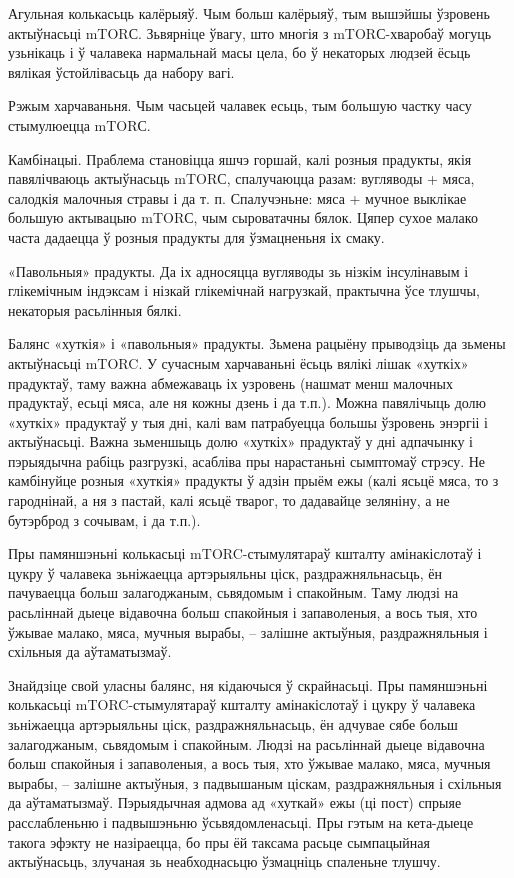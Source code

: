 Агульная колькасьць калёрыяў.
Чым больш калёрыяў, тым вышэйшы ўзровень актыўнасьці mTORС. Зьвярніце ўвагу, што многія з mTORС-хваробаў могуць узьнікаць і ў чалавека нармальнай масы цела, бо ў некаторых людзей ёсьць вялікая ўстойлівасьць да набору вагі.

Рэжым харчаваньня.
Чым часьцей чалавек есьць, тым большую частку часу стымулюецца mTORС.

Камбінацыі.
Праблема становіцца яшчэ горшай, калі розныя прадукты, якія павялічваюць актыўнасьць mTORС, спалучаюцца разам: вугляводы + мяса, салодкія малочныя стравы і да т. п. Спалучэньне: мяса + мучное выклікае большую актывацыю mTORС, чым сыроватачны бялок. Цяпер сухое малако часта дадаецца ў розныя прадукты для ўзмацненьня іх смаку.

«Павольныя» прадукты.
Да іх адносяцца вугляводы зь нізкім інсулінавым і глікемічным індэксам і нізкай глікемічнай нагрузкай, практычна ўсе тлушчы, некаторыя расьлінныя бялкі.

Балянс «хуткія» і «павольныя» прадукты.
Зьмена рацыёну прыводзіць да зьмены актыўнасьці mTORC. У сучасным харчаваньні ёсьць вялікі лішак «хуткіх» прадуктаў, таму важна абмежаваць іх узровень (нашмат менш малочных прадуктаў, есьці мяса, але ня кожны дзень і да т.п.). Можна павялічыць долю «хуткіх» прадуктаў у тыя дні, калі вам патрабуецца большы ўзровень энэргіі і актыўнасьці. Важна зьменшыць долю «хуткіх» прадуктаў у дні адпачынку і пэрыядычна рабіць разгрузкі, асабліва пры нарастаньні сымптомаў стрэсу. Не камбінуйце розныя «хуткія» прадукты ў адзін прыём ежы (калі ясьцё мяса, то з гароднінай, а ня з пастай, калі ясьцё тварог, то дадавайце зеляніну, а не бутэрброд з сочывам, і да т.п.).

Пры памяншэньні колькасьці mTORC-стымулятараў кшталту амінакіслотаў і цукру ў чалавека зьніжаецца артэрыяльны ціск, раздражняльнасьць, ён пачуваецца больш залагоджаным, сьвядомым і спакойным. Таму людзі на расьліннай дыеце відавочна больш спакойныя і запаволеныя, а вось тыя, хто ўжывае малако, мяса, мучныя вырабы, – залішне актыўныя, раздражняльныя і схільныя да аўтаматызмаў.

Знайдзіце свой уласны балянс, ня кідаючыся ў скрайнасьці.
Пры памяншэньні колькасьці mTORC-стымулятараў кшталту амінакіслотаў і цукру ў чалавека зьніжаецца артэрыяльны ціск, раздражняльнасьць, ён адчувае сябе больш залагоджаным, сьвядомым і спакойным. Людзі на расьліннай дыеце відавочна больш спакойныя і запаволеныя, а вось тыя, хто ўжывае малако, мяса, мучныя вырабы, – залішне актыўныя, з падвышаным ціскам, раздражняльныя і схільныя да аўтаматызмаў. Пэрыядычная адмова ад «хуткай» ежы (ці пост) спрыяе расслабленьню і падвышэньню ўсьвядомленасьці. Пры гэтым на кета-дыеце такога эфэкту не назіраецца, бо пры ёй таксама расьце сымпацыйная актыўнасьць, злучаная зь неабходнасьцю ўзмацніць спаленьне тлушчу.

